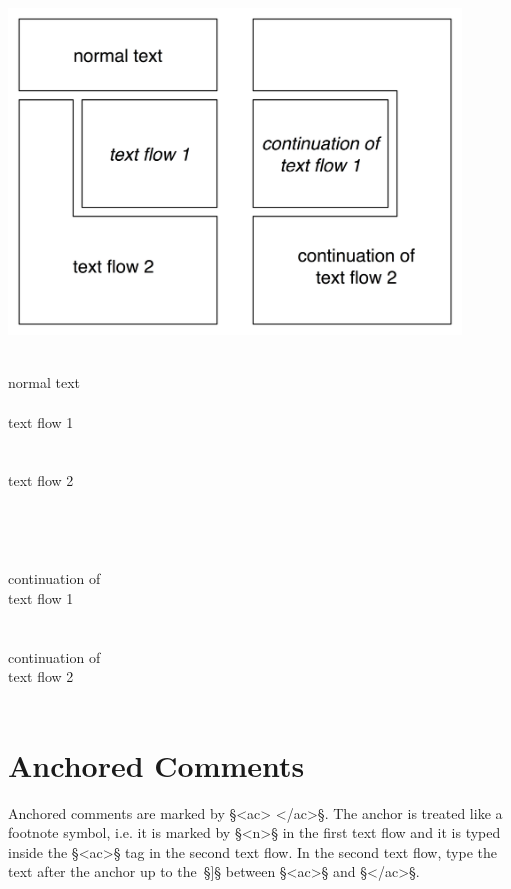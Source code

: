 \documentclass[fontsize=11pt, paper=a4, 
DIV15,
normalheadings,
parskip=half-, 
pointlessnumbers]{scrartcl}
\begin{document}
\begin{example}

\includegraphics[width=12cm]{two_textflows.png}

\begin{typeLatin}
 \\
normal text \\
 \\
text flow 1 \\
 \\
 \\
text flow 2 \\
 \\ \\
 \\
 \\
continuation of \\ 
text flow 1 \\
 \\
 \\
continuation of \\ 
text flow 2 \\
 \\
\end{typeLatin}
\end{example}

\section{Anchored Comments}

\begin{mainrule}
Anchored comments are marked by §<ac> </ac>§. The anchor is treated like a footnote symbol, i.e. it is marked by §<n>§ in the first text flow and it is typed inside the §<ac>§ tag in the second text flow. In the second text flow, type the text after the anchor up to the~§]§ between §<ac>§ and §</ac>§.
\end{mainrule}
\end{document}
